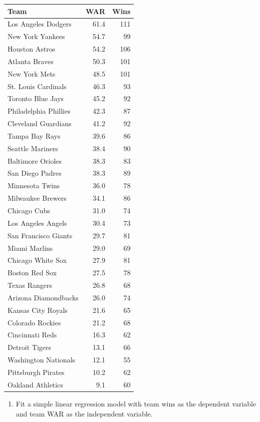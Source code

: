 \documentclass[
  11pt,
]{book}
\providecommand{\tightlist}{%
  \setlength{\itemsep}{0pt}\setlength{\parskip}{0pt}}
\theoremstyle{definition}
\theoremstyle{definition}
\theoremstyle{definition}
\theoremstyle{definition}
\theoremstyle{remark}
\begin{document}
\begin{tabular}{lrr}
\toprule
Team & WAR & Wins\\
\midrule
Los Angeles Dodgers & 61.4 & 111\\
New York Yankees & 54.7 & 99\\
Houston Astros & 54.2 & 106\\
Atlanta Braves & 50.3 & 101\\
New York Mets & 48.5 & 101\\
\addlinespace
St. Louis Cardinals & 46.3 & 93\\
Toronto Blue Jays & 45.2 & 92\\
Philadelphia Phillies & 42.3 & 87\\
Cleveland Guardians & 41.2 & 92\\
Tampa Bay Rays & 39.6 & 86\\
\addlinespace
Seattle Mariners & 38.4 & 90\\
Baltimore Orioles & 38.3 & 83\\
San Diego Padres & 38.3 & 89\\
Minnesota Twins & 36.0 & 78\\
Milwaukee Brewers & 34.1 & 86\\
\addlinespace
Chicago Cubs & 31.0 & 74\\
Los Angeles Angels & 30.4 & 73\\
San Francisco Giants & 29.7 & 81\\
Miami Marlins & 29.0 & 69\\
Chicago White Sox & 27.9 & 81\\
\addlinespace
Boston Red Sox & 27.5 & 78\\
Texas Rangers & 26.8 & 68\\
Arizona Diamondbacks & 26.0 & 74\\
Kansas City Royals & 21.6 & 65\\
Colorado Rockies & 21.2 & 68\\
\addlinespace
Cincinnati Reds & 16.3 & 62\\
Detroit Tigers & 13.1 & 66\\
Washington Nationals & 12.1 & 55\\
Pittsburgh Pirates & 10.2 & 62\\
Oakland Athletics & 9.1 & 60\\
\bottomrule
\end{tabular}

\newpage

\begin{enumerate}
\def\labelenumi{(\alph{enumi})}
\setcounter{enumi}{1}
\tightlist
\item
  Fit a simple linear regression model with team wins as the dependent variable and team WAR as the independent variable.
\end{enumerate}
\end{document}
